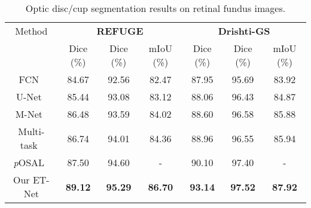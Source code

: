 \documentclass[runningheads,a4paper]{llncs}
\begin{document}
\begin{table}[!t]
\footnotesize
\begin{center}
\caption{Optic disc/cup segmentation results on retinal fundus images.}
\begin{tabular}{c|c|c|c|c|c|c}
	\hline
	             Method               &         \multicolumn{3}{c|}{\textbf{REFUGE}}         &       \multicolumn{3}{c}{\textbf{Drishti-GS}}        \\ \cline{2-7}
	                                  & Dice (\%) & Dice (\%) &   mIoU (\%)    & Dice (\%) & Dice (\%) &   mIoU (\%)    \\ \hline
	         FCN~\cite{fcn}           &      84.67       &      92.56       &     82.47      &      87.95       &      95.69       &     83.92      \\
	  U-Net~\cite{Ronneberger2015}    &      85.44       &      93.08       &     83.12      &      88.06       &      96.43       &     84.87      \\
	     M-Net~\cite{mnet2018fu}      &      86.48       &      93.59       &     84.02      &      88.60       &      96.58       &     85.88      \\
	   Multi-task~\cite{multitask}    &      86.74       &      94.01       &     84.36      &      88.96       &      96.55       &     85.94      \\
	\textit{p}OSAL~\cite{Wang2019tmi} &      87.50       &      94.60       &       -        &      90.10       &      97.40       &       -        \\ \hline
	           Our ET-Net             &  \textbf{89.12}  &  \textbf{95.29}  & \textbf{86.70} &  \textbf{93.14}  &  \textbf{97.52}  & \textbf{87.92} \\ \hline
\end{tabular}
\label{tab:fundus}
\end{center}
\end{table}
\end{document}
